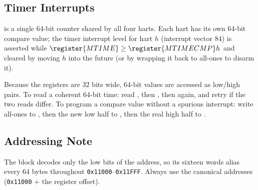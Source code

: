 \subsection{Timer Interrupts}

 is a single 64-bit counter shared by all four harts. Each hart has its own 64-bit compare value; the timer interrupt level for hart $h$ (interrupt vector 84) is asserted while $\register{MTIME} \geq \register{MTIMECMP}h$ and cleared by moving $h$ into the future (or by wrapping it back to all-ones to disarm it).

Because the registers are 32 bits wide, 64-bit values are accessed as low/high pairs. To read a coherent 64-bit time: read , then , then  again, and retry if the two  reads differ. To program a compare value without a spurious interrupt: write all-ones to , then the new low half to , then the real high half to .

\subsection{Addressing Note}

The block decodes only the low bits of the address, so its sixteen words alias every 64 bytes throughout \texttt{0x11000}--\texttt{0x11FFF}. Always use the canonical addresses (\texttt{0x11000} + the register offset).

